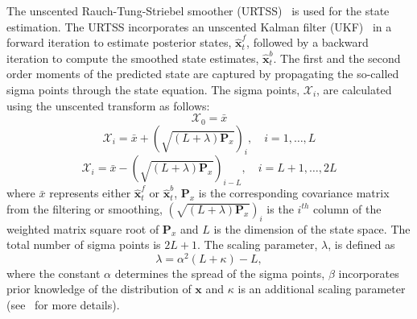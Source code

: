 \documentclass[10pt]{article}
\begin{document}
The unscented Rauch-Tung-Striebel smoother (URTSS)~\cite{Sarkka2010} is used for the state estimation. The URTSS incorporates an unscented Kalman filter (UKF)~\cite{Julier1997, Merwe2003} in a forward iteration to estimate posterior states, $\hat{\mathbf x}_t^{f}$, followed by a backward iteration to compute the smoothed state estimates, $\hat{\mathbf x}_t^{b}$. The first and the second order moments of the predicted state are captured by propagating the so-called sigma points through the state equation. The sigma points, $\mathcal X_i$, are calculated using the unscented transform as follows:
\begin{equation}\label{eq:sigmapoints1}
	\mathcal X_{0}=\bar x 
\end{equation}
\begin{equation}
	\mathcal X_{i}=\bar x+\left(\sqrt{( L + \lambda)\mathbf P_x}\right)_i, \quad i=1, \dots, L 
\end{equation}
\begin{equation}\label{eq:sigmapoints2}
	\mathcal X_{i}=\bar x-\left(\sqrt{( L + \lambda)\mathbf P_x}\right)_{i- L}, \quad i= L+1, \dots, 2 L 
\end{equation}
where $\bar x$ represents either $\hat{\mathbf x}_t^{f}$ or $\hat{\mathbf x}_t^{b}$, $\mathbf{P}_x$ is the corresponding covariance matrix from the filtering or smoothing, $\left(\sqrt{( L + \lambda)\mathbf P_x}\right)_i$ is the $i^{th}$ column of the weighted matrix square root of $\mathbf P_x$ and $L$ is the dimension of the state space. The total number of sigma points is $2L+1$. The scaling parameter, $\lambda$, is defined as 
\begin{equation}\label{eq:sigmapoints3}
	\lambda=\alpha^2( L+\kappa) - L, 
\end{equation}
where the constant $\alpha$ determines the spread of the sigma points, $\beta$ incorporates prior knowledge of the distribution of $\mathbf{x}$ and $\kappa$ is an additional scaling parameter (see~\cite{Haykin2001} for more details). 
\end{document}
